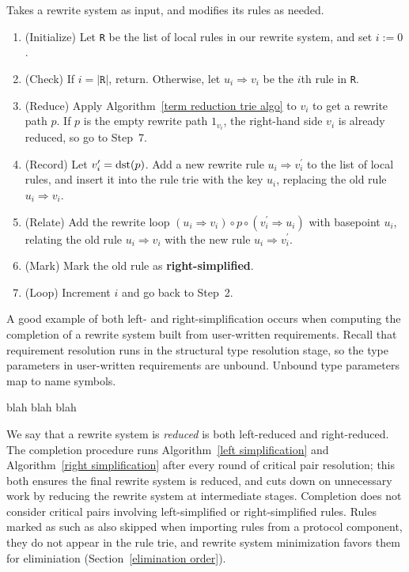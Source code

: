 \documentclass[../generics]{subfiles}
\begin{document}
\begin{algorithm}\label{right simplification}
Takes a rewrite system as input, and modifies its rules as needed.
\begin{enumerate}
\item (Initialize) Let \texttt{R} be the list of local rules in our rewrite system, and set $i:=0$.
\item (Check) If $i=|\texttt{R}|$, return. Otherwise, let $u_i\Rightarrow v_i$ be the $i$th rule in \texttt{R}.
\item (Reduce) Apply Algorithm~\ref{term reduction trie algo} to $v_i$ to get a rewrite path $p$. If $p$ is the empty rewrite path $1_{v_i}$, the right-hand side $v_i$ is already reduced, so go to Step~7.
\item (Record) Let $v^\prime_i=\operatorname{dst}(p)$. Add a new rewrite rule $u_i\Rightarrow v^\prime_i$ to the list of local rules, and insert it into the rule trie with the key $u_i$, replacing the old rule $u_i\Rightarrow v_i$.
\item (Relate) Add the rewrite loop $(u_i\Rightarrow v_i)\circ p\circ(v^\prime_i\Rightarrow u_i)$ with basepoint $u_i$, relating the old rule $u_i\Rightarrow v_i$ with the new rule $u_i\Rightarrow v^\prime_i$.
\item (Mark) Mark the old rule as \textbf{right-simplified}.
\item (Loop) Increment $i$ and go back to Step~2.
\end{enumerate}
\end{algorithm}
A good example of both left- and right-simplification occurs when computing the completion of a rewrite system built from user-written requirements. Recall that requirement resolution runs in the structural type resolution stage, so the type parameters in user-written requirements are unbound. Unbound type parameters map to name symbols.

blah blah blah

We say that a rewrite system is \emph{reduced} is both left-reduced and right-reduced. The completion procedure runs Algorithm~\ref{left simplification} and Algorithm~\ref{right simplification} after every round of critical pair resolution; this both ensures the final rewrite system is reduced, and cuts down on unnecessary work by reducing the rewrite system at intermediate stages. Completion does not consider critical pairs involving left-simplified or right-simplified rules. Rules marked as such as also skipped when importing rules from a protocol component, they do not appear in the rule trie, and rewrite system minimization favors them for eliminiation (Section~\ref{elimination order}).
\end{document}
